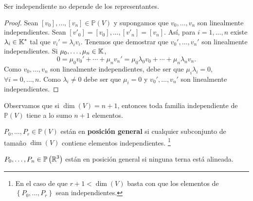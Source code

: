 \begin{lema}
Ser independiente no depende de los representantes.
\end{lema}
\begin{proof}
	Sean $\displaystyle [v_{0}], \ldots, [v_{n}] \in \mathbb{P}\left(V\right)$ y supongamos que $\displaystyle v_{0}, \ldots, v_{n} $ son linealmente independientes. Sean $\displaystyle [v'_{0}] = [v_{0}], \ldots, [v'_{n}] = [v_{n}] $. Así, para $\displaystyle i = 1, \ldots, n $ existe $\displaystyle \lambda_{i} \in \mathbb{K}^{*} $ tal que $\displaystyle v_{i}' = \lambda_{i}v_{i} $. 
	Tenemos que demostrar que $\displaystyle v_{0}', \ldots, v_{n}' $ son linealmente independientes. Si $\displaystyle \mu_{0}, \ldots, \mu_{n} \in \mathbb{K} $,
	\[0 = \mu_{0}v_{0}' + \cdots + \mu_{n}v_{n}' = \mu_{0}\lambda_{0}v_{0} + \cdots + \mu_{n}\lambda_{n}v_{n} .\]
	Como $\displaystyle v_{0}, \ldots, v_{n} $ son linealmente independientes, debe ser que $\displaystyle \mu_{i}\lambda_{i} = 0 $, $\displaystyle \forall i = 0, \ldots, n $. Como $\displaystyle \lambda_{i} \neq 0 $ debe ser que $\displaystyle \mu_{i} = 0 $ y $\displaystyle v_{0}', \ldots, v_{n}' $ son linealmente independientes.
\end{proof}
\begin{observation}
Observamos que si $\displaystyle \dim\left(V\right) = n +1$, entonces toda familia independiente de $\displaystyle \mathbb{P}\left(V\right) $ tiene a lo sumo $\displaystyle n +1 $ elementos.
\end{observation}
\begin{definition}
	$\displaystyle P_{0}, \ldots, P_{r} \in \mathbb{P}\left(V\right) $ están en \textbf{posición general} si cualquier subconjunto de tamaño $\displaystyle \dim\left(V\right) $ contiene elementos independientes. \footnote{En el caso de que $\displaystyle r+1 < \dim\left(V\right) $ basta con que los elementos de $\displaystyle \left\{ P_{0}, \ldots, P_{r}\right\}  $ sean independientes.} 
\end{definition}
\begin{eg}
$\displaystyle P_{0}, \ldots, P_{n} \in \mathbb{P}\left(\mathbb{R}^{3}\right) $ están en posición general si ninguna terna está alineada. 
\end{eg}

